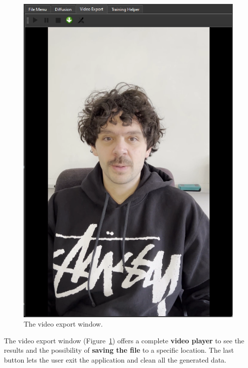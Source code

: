 \documentclass[preprint]{elsarticle}
\begin{document}
\begin{figure}[H]
	\centering
	\includegraphics[scale=0.5, keepaspectratio]{img/project_img/video-window.png}
	\caption{The video export window.}
	\label{fig:video-player}
\end{figure}

The video export window (Figure~\ref{fig:video-player}) offers a complete \textbf{video player} 
to see the results and the possibility of \textbf{saving the file} to a specific location. 
The last button lets the user exit the application and clean all the generated data.
\end{document}
